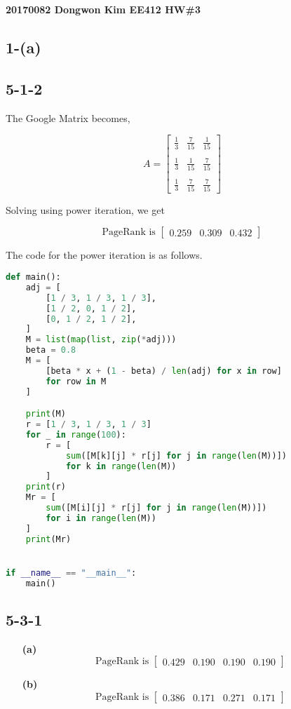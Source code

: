 \documentclass{article}
\begin{document}
\noindent
\textbf{20170082 Dongwon Kim EE412 HW\#3}\\

\noindent
\subsection*{1-(a)}
\subsection*{5-1-2}
The Google Matrix becomes,

\[
A = \begin{bmatrix}
    \frac{1}{3} & \frac{7}{15} & \frac{1}{15} \\ \\
    \frac{1}{3} & \frac{1}{15} & \frac{7}{15} \\ \\
    \frac{1}{3} & \frac{7}{15} & \frac{7}{15}          
\end{bmatrix}
\]

\noindent
Solving using power iteration, we get

\[
\text{PageRank is } \begin{bmatrix} 0.259 & 0.309 & 0.432 \end{bmatrix}
\]

\noindent
The code for the power iteration is as follows.

\begin{lstlisting}[language=Python]
def main():
    adj = [
        [1 / 3, 1 / 3, 1 / 3],
        [1 / 2, 0, 1 / 2],
        [0, 1 / 2, 1 / 2],
    ]
    M = list(map(list, zip(*adj)))
    beta = 0.8
    M = [
        [beta * x + (1 - beta) / len(adj) for x in row]
        for row in M
    ]

    print(M)
    r = [1 / 3, 1 / 3, 1 / 3]
    for _ in range(100):
        r = [
            sum([M[k][j] * r[j] for j in range(len(M))])
            for k in range(len(M))
        ]
    print(r)
    Mr = [
        sum([M[i][j] * r[j] for j in range(len(M))])
        for i in range(len(M))
    ]
    print(Mr)


if __name__ == "__main__":
    main()
\end{lstlisting}

\noindent
\subsection*{5-3-1}
\begin{enumerate}
    \item [\textbf{(a)}] \[
        \text{PageRank is } \begin{bmatrix} 0.429 & 0.190 & 0.190 & 0.190 \end{bmatrix}
        \]
    \item[\textbf{(b)}] \[
        \text{PageRank is } \begin{bmatrix} 0.386 & 0.171 & 0.271 & 0.171 \end{bmatrix}
        \]
\end{enumerate}
\end{document}
